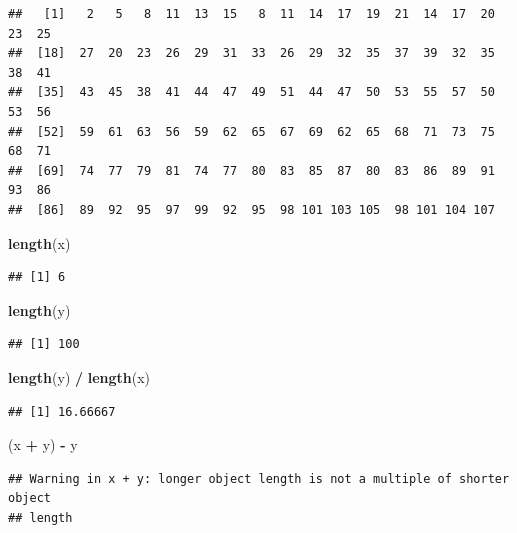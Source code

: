 \documentclass[]{book}
\newenvironment{Shaded}{\begin{snugshade}}{\end{snugshade}}
\newcommand{\KeywordTok}[1]{\textcolor[rgb]{0.13,0.29,0.53}{\textbf{#1}}}
\newcommand{\StringTok}[1]{\textcolor[rgb]{0.31,0.60,0.02}{#1}}
\newcommand{\OperatorTok}[1]{\textcolor[rgb]{0.81,0.36,0.00}{\textbf{#1}}}
\newcommand{\NormalTok}[1]{#1}
\theoremstyle{definition}
\theoremstyle{definition}
\theoremstyle{definition}
\theoremstyle{remark}
\begin{document}
\begin{verbatim}
##   [1]   2   5   8  11  13  15   8  11  14  17  19  21  14  17  20  23  25
##  [18]  27  20  23  26  29  31  33  26  29  32  35  37  39  32  35  38  41
##  [35]  43  45  38  41  44  47  49  51  44  47  50  53  55  57  50  53  56
##  [52]  59  61  63  56  59  62  65  67  69  62  65  68  71  73  75  68  71
##  [69]  74  77  79  81  74  77  80  83  85  87  80  83  86  89  91  93  86
##  [86]  89  92  95  97  99  92  95  98 101 103 105  98 101 104 107
\end{verbatim}

\begin{Shaded}
\begin{Highlighting}[]
\KeywordTok{length}\NormalTok{(x)}
\end{Highlighting}
\end{Shaded}

\begin{verbatim}
## [1] 6
\end{verbatim}

\begin{Shaded}
\begin{Highlighting}[]
\KeywordTok{length}\NormalTok{(y)}
\end{Highlighting}
\end{Shaded}

\begin{verbatim}
## [1] 100
\end{verbatim}

\begin{Shaded}
\begin{Highlighting}[]
\KeywordTok{length}\NormalTok{(y) }\OperatorTok{/}\StringTok{ }\KeywordTok{length}\NormalTok{(x)}
\end{Highlighting}
\end{Shaded}

\begin{verbatim}
## [1] 16.66667
\end{verbatim}

\begin{Shaded}
\begin{Highlighting}[]
\NormalTok{(x }\OperatorTok{+}\StringTok{ }\NormalTok{y) }\OperatorTok{-}\StringTok{ }\NormalTok{y}
\end{Highlighting}
\end{Shaded}

\begin{verbatim}
## Warning in x + y: longer object length is not a multiple of shorter object
## length
\end{verbatim}
\end{document}
